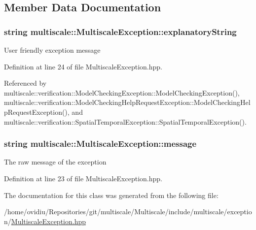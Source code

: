 \subsection{Member Data Documentation}
\hypertarget{classmultiscale_1_1MultiscaleException_acf3042077605955cbb36a4472ed80233}{
\subsubsection[{explanatory\-String}]{\setlength{\rightskip}{0pt plus 5cm}string multiscale\-::\-Multiscale\-Exception\-::explanatory\-String\hspace{0.3cm}{\ttfamily [protected]}}}\label{classmultiscale_1_1MultiscaleException_acf3042077605955cbb36a4472ed80233}
User friendly exception message 

Definition at line 24 of file Multiscale\-Exception.\-hpp.



Referenced by multiscale\-::verification\-::\-Model\-Checking\-Exception\-::\-Model\-Checking\-Exception(), multiscale\-::verification\-::\-Model\-Checking\-Help\-Request\-Exception\-::\-Model\-Checking\-Help\-Request\-Exception(), and multiscale\-::verification\-::\-Spatial\-Temporal\-Exception\-::\-Spatial\-Temporal\-Exception().

\hypertarget{classmultiscale_1_1MultiscaleException_ad33583bafdf81f924849362ddbc89566}{
\subsubsection[{message}]{\setlength{\rightskip}{0pt plus 5cm}string multiscale\-::\-Multiscale\-Exception\-::message\hspace{0.3cm}{\ttfamily [protected]}}}\label{classmultiscale_1_1MultiscaleException_ad33583bafdf81f924849362ddbc89566}
The raw message of the exception 

Definition at line 23 of file Multiscale\-Exception.\-hpp.



The documentation for this class was generated from the following file\-:\begin{DoxyCompactItemize}
\item 
/home/ovidiu/\-Repositories/git/multiscale/\-Multiscale/include/multiscale/exception/\hyperlink{MultiscaleException_8hpp}{Multiscale\-Exception.\-hpp}\end{DoxyCompactItemize}
